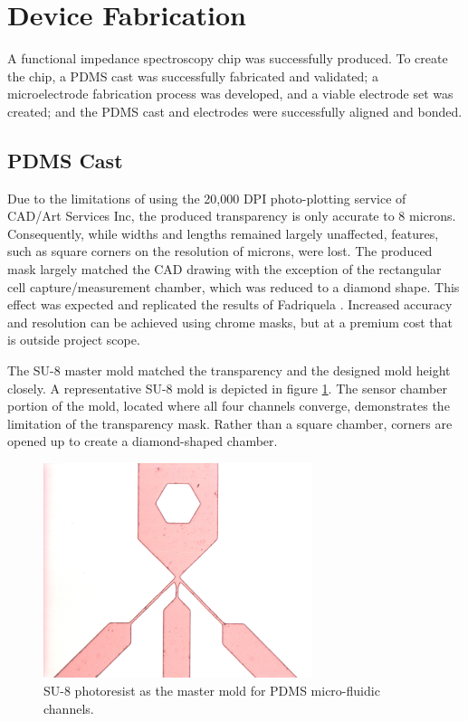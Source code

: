 
\section{Device Fabrication}

\par A functional impedance spectroscopy chip was successfully produced. To create the chip, a PDMS cast was successfully fabricated and validated; a microelectrode fabrication process was developed, and a viable electrode set was created; and the PDMS cast and electrodes were successfully aligned and bonded.

\subsection{PDMS Cast}
\label{sec:PDMS_cast_fabrication}

\par Due to the limitations of using the 20,000 DPI photo-plotting service of CAD/Art Services Inc, the produced transparency is only accurate to 8 microns. Consequently, while widths and lengths remained largely unaffected, features, such as square corners on the resolution of microns, were lost. The produced mask largely matched the CAD drawing with the exception of the rectangular cell capture/measurement chamber, which was reduced to a diamond shape. This effect was expected and replicated the results of Fadriquela \cite{fadriquela_design_2009-1}. Increased accuracy and resolution can be achieved using chrome masks, but at a premium cost that is outside project scope. 

\par The SU-8 master mold matched the transparency and the designed mold height closely. A representative SU-8 mold is depicted in figure \ref{fig:su8_results}. The sensor chamber portion of the mold, located where all four channels converge, demonstrates the limitation of the transparency mask. Rather than a square chamber, corners are opened up to create a diamond-shaped chamber.

\begin{figure}[H]
    \centering
    \includegraphics[width=0.7\textwidth]{images/su8_results.png}
    \caption{SU-8 photoresist as the master mold for PDMS micro-fluidic channels.}
    \label{fig:su8_results}
\end{figure}



